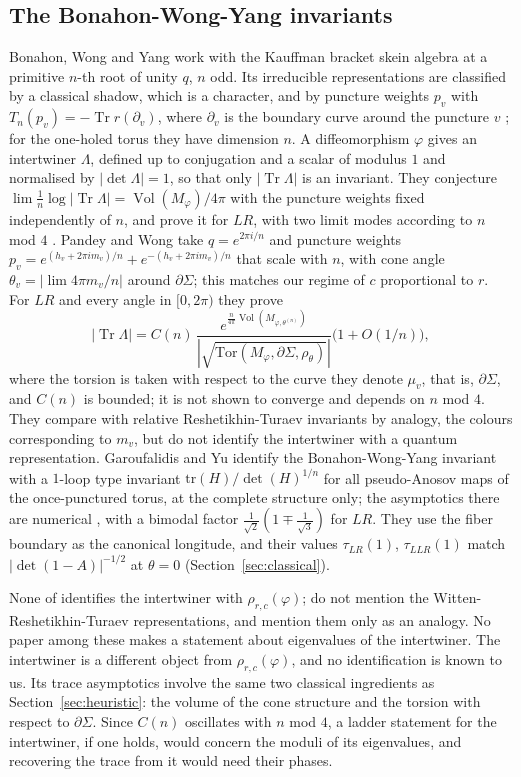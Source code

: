 \documentclass[11pt]{amsart}
\theoremstyle{definition}
\theoremstyle{remark}
\newcommand{\Vol}{\operatorname{Vol}}
\newcommand{\Tr}{\operatorname{Tr}}
\begin{document}
\subsection{The Bonahon-Wong-Yang invariants}
Bonahon, Wong and Yang \cite{BWY1} work with the Kauffman bracket skein algebra at a
primitive $n$-th root of unity $q$, $n$ odd. Its irreducible representations are
classified by a classical shadow, which is a character, and by puncture weights $p_v$
with $T_n(p_v) = -\Tr r(\partial_v)$, where $\partial_v$ is the boundary curve around
the puncture $v$ \cite[Thms.~2 and~3]{BWY1}; for the one-holed torus
they have dimension $n$. A diffeomorphism $\varphi$ gives an
intertwiner $\Lambda$, defined up to conjugation and a scalar of modulus $1$ and
normalised by $|\det\Lambda| = 1$, so that only $|\Tr\Lambda|$ is an invariant. They
conjecture $\lim \frac1n\log|\Tr\Lambda| = \Vol(M_\varphi)/4\pi$ with the puncture
weights fixed independently of $n$, and prove it for $LR$, with two limit modes
according to $n$ mod $4$ \cite[Thm.~19 and Cor.~20]{BWY2}. Pandey and Wong \cite{PW}
take $q = e^{2\pi i/n}$ and puncture weights $p_v = e^{(h_v + 2\pi i m_v)/n} +
e^{-(h_v + 2\pi i m_v)/n}$ that scale with $n$, with cone angle
$\theta_v = |\lim 4\pi m_v/n|$ around $\partial\Sigma$; this matches our regime of $c$
proportional to $r$. For $LR$ and every angle in $[0,2\pi)$ they prove
\cite[Thm.~1.3 and Cor.~1.4]{PW}
\[
|\Tr\Lambda| = C(n)\,
\frac{e^{\frac{n}{4\pi}\Vol(M_{\varphi,\theta^{(n)}})}}{|\sqrt{\mathrm{Tor}(M_\varphi,\partial\Sigma,\rho_\theta)}|}
\big(1 + O(1/n)\big),
\]
where the torsion is taken with respect to the curve they denote $\mu_v$, that is,
$\partial\Sigma$, and $C(n)$ is bounded; it is not shown to converge and depends on $n$ mod $4$. They
compare with relative Reshetikhin-Turaev invariants by analogy, the colours
corresponding to $m_v$, but do not identify the intertwiner with a quantum
representation. Garoufalidis and Yu \cite[Conj.~1.1, (3), and Thm.~1.2]{GY} identify
the Bonahon-Wong-Yang invariant with a $1$-loop type invariant
$\mathrm{tr}(H)/\det(H)^{1/n}$ \cite[Def.~3.5, (59)]{GY} for all pseudo-Anosov maps of
the once-punctured torus, at the complete structure only; the asymptotics there are
numerical \cite[(5)]{GY}, with a bimodal factor $\frac{1}{\sqrt2}(1 \mp
\frac{1}{\sqrt3})$ for $LR$. They use the fiber boundary as the canonical longitude,
and their values $\tau_{LR}(1)$, $\tau_{LLR}(1)$ match $|\det(1-A)|^{-1/2}$ at
$\theta = 0$ (Section~\ref{sec:classical}).

None of \cite{BWY1, BWY2, PW, GY} identifies the intertwiner with
$\rho_{r,c}(\varphi)$; \cite{BWY1, BWY2} do not mention the Witten-Reshetikhin-Turaev
representations, and \cite{PW, GY} mention them only as an analogy. No paper among
these makes a statement about eigenvalues of the intertwiner. The intertwiner is a
different object from $\rho_{r,c}(\varphi)$, and no identification is known to us. Its
trace asymptotics involve the same two classical ingredients as
Section~\ref{sec:heuristic}: the volume of the cone structure and the torsion with
respect to $\partial\Sigma$. Since $C(n)$ oscillates with $n$ mod $4$, a ladder
statement for the intertwiner, if one holds, would concern the moduli of its
eigenvalues, and recovering the trace from it would need their phases.
\end{document}
